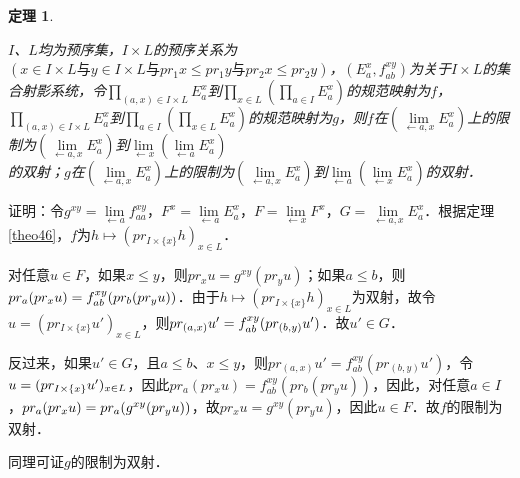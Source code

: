 \documentclass[12pt, a4paper, oneside]{book}
\newtheorem{theo}{定理}
\begin{document}
			\begin{theo}\label{theo178}
				\hfill\par
				$I$、$L$均为预序集，$I\times L$的预序关系为$(x\in I\times L\text{与}y\in I\times L\text{与}pr_1x\leq pr_1y\text{与}pr_2x\leq pr_2y)$，$(E_a^x, f_{ab}^{xy})$为关于$I\times L$的集合射影系统，令$\prod\limits_{(a, x)\in I\times L}E_a^x$到$\prod\limits_{x\in L}(\prod\limits_{a\in I}E_a^x)$的规范映射为$f$，$\prod\limits_{(a, x)\in I\times L}E_a^x$到$\prod\limits_{a\in I}(\prod\limits_{x\in L}E_a^x)$的规范映射为$g$，则$f$在$(\lim\limits_{\gets a, x}E_a^x)$上的限制为$(\lim\limits_{\gets a, x}E_a^x)$到$\lim\limits_{\gets x}(\lim\limits_{\gets a}E_a^x)$\\的双射；$g$在$(\lim\limits_{\gets a, x}E_a^x)$上的限制为$(\lim\limits_{\gets a, x}E_a^x)$到$\lim\limits_{\gets a}(\lim\limits_{\gets x}E_a^x)$的双射．
			\end{theo}
			证明：令$g^{xy}= \lim\limits_{\gets a}f_{aa}^{xy}$，$F^x=\lim\limits_{\gets a}E_a^x$，$F= \lim\limits_{\gets x}F^x$，$G=\lim\limits_{\gets a, x}E_a^x$．根据定理\ref{theo46}，$f$为$h\mapsto (pr_{I\times \{x\}}h)_{x\in L}$．
			\par
			对任意$u\in F$，如果$x\leq y$，则$pr_xu=g^{xy}(pr_yu)$；如果$a\leq b$，则$pr_a(pr_xu)=\\f_{ab}^{xy}(pr_b(pr_yu))$．由于$h\mapsto (pr_{I\times \{x\}}h)_{x\in L}$为双射，故令$u=(pr_{I\times \{x\}}u')_{x\in L}$，则$pr_{(a, x)}u'=\\f_{ab}^{xy}(pr_{(b, y)}u')$．故$u'\in G$．
			\par
			反过来，如果$u'\in G$，且$a\leq b$、$x\leq y$，则$pr_{(a, x)}u'=f_{ab}^{xy}(pr_{(b, y)}u')$，令$u=\\(pr_{I\times \{x\}}u')_{x\in L}$，因此$pr_a(pr_xu)=f_{ab}^{xy}(pr_b(pr_yu))$，因此，对任意$a\in I$，$pr_a(pr_xu)=\\pr_a(g^{xy}(pr_yu))$，故$pr_xu= g^{xy}(pr_yu)$，因此$u\in F$．故$f$的限制为双射．
			\par
			同理可证$g$的限制为双射．
			
\end{document}
